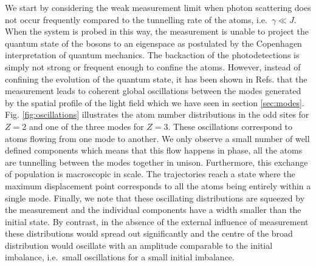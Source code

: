 We start by considering the weak measurement limit when photon
scattering does not occur frequently compared to the tunnelling rate
of the atoms, i.e.~$\gamma \ll J$. When the system is probed in this
way, the measurement is unable to project the quantum state of the
bosons to an eigenspace as postulated by the Copenhagen interpretation
of quantum mechanics. The backaction of the photodetections is simply
not strong or frequent enough to confine the atoms. However, instead
of confining the evolution of the quantum state, it has been shown in
Refs. \cite{mazzucchi2016, mazzucchi2016njp} that the measurement
leads to coherent global oscillations between the modes generated by
the spatial profile of the light field which we have seen in section
\ref{sec:modes}. Fig. \ref{fig:oscillations} illustrates the atom
number distributions in the odd sites for $Z = 2$ and one of the three
modes for $Z = 3$. These oscillations correspond to atoms flowing from
one mode to another. We only observe a small number of well defined
components which means that this flow happens in phase, all the atoms
are tunnelling between the modes together in unison. Furthermore, this
exchange of population is macroscopic in scale. The trajectories reach
a state where the maximum displacement point corresponds to all the
atoms being entirely within a single mode. Finally, we note that these
oscillating distributions are squeezed by the measurement and the
individual components have a width smaller than the initial state. By
contrast, in the absence of the external influence of measurement
these distributions would spread out significantly and the centre of
the broad distribution would oscillate with an amplitude comparable to
the initial imbalance, i.e.~small oscillations for a small initial
imbalance.

